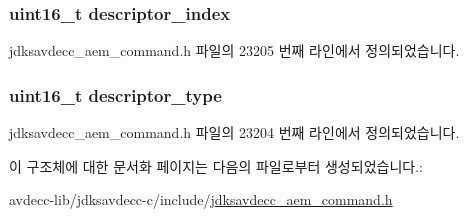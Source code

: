 \subsubsection[{\texorpdfstring{descriptor\+\_\+index}{descriptor_index}}]{\setlength{\rightskip}{0pt plus 5cm}uint16\+\_\+t descriptor\+\_\+index}\hypertarget{structjdksavdecc__aem__command__start__streaming_a042bbc76d835b82d27c1932431ee38d4}{}\label{structjdksavdecc__aem__command__start__streaming_a042bbc76d835b82d27c1932431ee38d4}


jdksavdecc\+\_\+aem\+\_\+command.\+h 파일의 23205 번째 라인에서 정의되었습니다.

\subsubsection[{\texorpdfstring{descriptor\+\_\+type}{descriptor_type}}]{\setlength{\rightskip}{0pt plus 5cm}uint16\+\_\+t descriptor\+\_\+type}\hypertarget{structjdksavdecc__aem__command__start__streaming_ab7c32b6c7131c13d4ea3b7ee2f09b78d}{}\label{structjdksavdecc__aem__command__start__streaming_ab7c32b6c7131c13d4ea3b7ee2f09b78d}


jdksavdecc\+\_\+aem\+\_\+command.\+h 파일의 23204 번째 라인에서 정의되었습니다.



이 구조체에 대한 문서화 페이지는 다음의 파일로부터 생성되었습니다.\+:\begin{DoxyCompactItemize}
\item 
avdecc-\/lib/jdksavdecc-\/c/include/\hyperlink{jdksavdecc__aem__command_8h}{jdksavdecc\+\_\+aem\+\_\+command.\+h}\end{DoxyCompactItemize}
